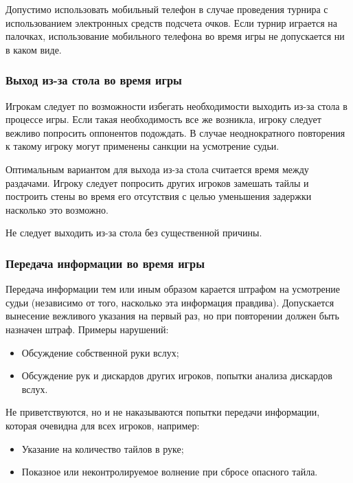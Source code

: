 Допустимо использовать мобильный телефон в случае проведения турнира с использованием электронных средств подсчета очков. Если турнир играется на палочках, использование мобильного телефона во время игры не допускается ни в каком виде.

\subsubsection{Выход из-за стола во время игры}

Игрокам следует по возможности избегать необходимости выходить из-за стола в процессе игры. Если такая необходимость все же возникла, игроку следует вежливо попросить оппонентов подождать. В случае неоднократного повторения к такому игроку могут применены санкции на усмотрение судьи.

Оптимальным вариантом для выхода из-за стола считается время между раздачами. Игроку следует попросить других игроков замешать тайлы и построить стены во время его отсутствия с целью уменьшения задержки насколько это возможно.

Не следует выходить из-за стола без существенной причины.

\subsubsection{Передача информации во время игры}

Передача информации тем или иным образом карается штрафом на усмотрение судьи (независимо от того, насколько эта информация правдива). Допускается вынесение вежливого указания на первый раз, но при повторении должен быть назначен штраф. Примеры нарушений:
\begin{itemize}
	\item Обсуждение собственной руки вслух;
	\item Обсуждение рук и дискардов других игроков, попытки анализа дискардов вслух.
\end{itemize}

Не приветствуются, но и не наказываются попытки передачи информации, которая очевидна для всех игроков, например:
\begin{itemize}
	\item Указание на количество тайлов в руке;
	\item Показное или неконтролируемое волнение при сбросе опасного тайла.
\end{itemize}


